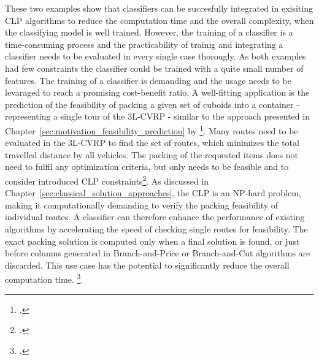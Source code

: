 These two examples show that classifiers can be succesfully integrated in exisiting \gls{CLP}
algorithms to reduce the computation time and the overall complexity, when the classifying model
is well trained. However, the training of a classifier is a time-consuming process and the
practicability of trainig and integrating a classifier needs to be evaluated in every single
case thorougly. As both examples had few constraints the classifier could be trained with a quite
small number of features. The training of a classifier is demanding and the usage needs to be levaraged to reach a promising
cost-benefit ratio. A well-fitting application is the prediction of the feasibility of
packing a given set of cuboids into a container - representing a single tour of the \gls{3L-CVRP} - similar to the approach
presented in Chapter~\ref{sec:motivation_feasibility_prediction} by \citeauthor*{zhang_learning-based_2022}\footcite[cf.][]{zhang_learning-based_2022}.
Many routes need to be evaluated in the \gls{3L-CVRP} to find the set of routes, which minimizes the
total travelled distance by all vehicles. The packing of the requested items does not need to
fulfil any optimization criteria, but only needs to be feasible and to consider introduced \gls{CLP} constraints\footcite[cf.][]{tamke_branch-and-cut_2024}.
As discussed in Chapter~\ref{sec:classical_solution_approaches}, the \gls{CLP} is an NP-hard problem,
making it computationally demanding to verify the packing feasibility of individual routes.
A classifier can therefore enhance the performance of existing algorithms by accelerating the speed
of checking single routes for feasibility. The exact packing solution is computed only when a final
solution is found, or just before columns generated in Branch-and-Price or Branch-and-Cut algorithms
are discarded. This use case has the potential to significantly reduce the overall computation time. \footcite[cf.][pp. 9--11]{zhang_learning-based_2022}.
